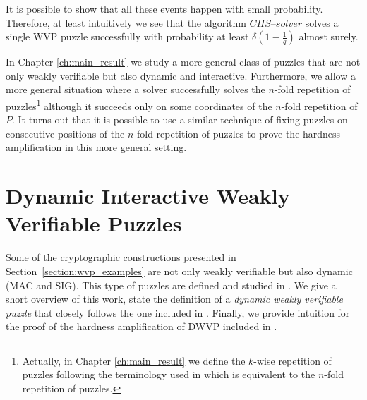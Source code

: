 It is possible to show that all these events happen with small probability.
Therefore, at least intuitively we see that the algorithm $\mathit{CHS\text{--}solver}$
solves a single WVP puzzle successfully with probability at least $\delta(1\!-\!\frac{1}{q})$ almost surely.

In Chapter \ref{ch:main_result} we study a more general class of puzzles that are not only weakly verifiable but also dynamic and interactive.
Furthermore, we allow a more general situation where a solver successfully solves the $n$-fold repetition of puzzles\footnote{Actually,
in Chapter \ref{ch:main_result} we define the $k$-wise repetition of puzzles following the terminology used in \cite{Dodis:2009:SAI:1530441.1530450}
which is equivalent to the $n$-fold repetition of puzzles.}
although it succeeds only on some coordinates of the $n$-fold repetition of $P$.
It turns out that it is possible to use a similar technique of fixing puzzles on consecutive positions of the $n$-fold repetition of
puzzles to prove the hardness amplification in this more general setting.
%
\section{Dynamic Interactive Weakly Verifiable Puzzles}
\label{subsec:dijk}
Some of the cryptographic constructions presented in Section~\ref{section:wvp_examples}
are not only weakly verifiable but also dynamic (MAC and SIG). This type of puzzles are defined and studied in \cite{Dodis:2009:SAI:1530441.1530450}.
We give a short overview of this work, state the definition of a \textit{dynamic weakly verifiable puzzle} that closely follows
the one included in \cite{Dodis:2009:SAI:1530441.1530450}. Finally, we provide intuition for the proof of the hardness amplification of DWVP
included in \cite{Dodis:2009:SAI:1530441.1530450}.

